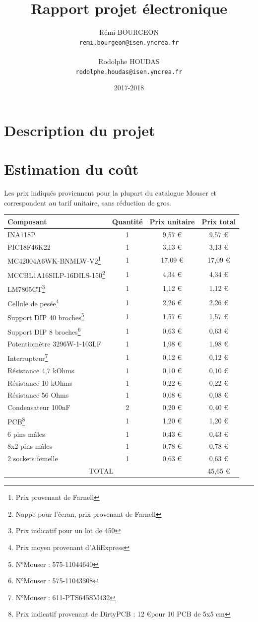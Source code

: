 \documentclass[a4paper,11pt,titlepage]{article}
\title{Rapport projet électronique}
\author{Rémi BOURGEON\\
\texttt{remi.bourgeon@isen.yncrea.fr}\\\\
Rodolphe HOUDAS\\
\texttt{rodolphe.houdas@isen.yncrea.fr}}
\date{2017-2018}
\begin{document}
\maketitle
\tableofcontents
\newpage


\section{Description du projet}

\section{Estimation du coût}

Les prix indiqués proviennent pour la plupart du catalogue Mouser et correspondent au tarif unitaire, sans réduction de gros.\\

\noindent
\begin{tabularx}{\textwidth}{l|c|c|c}
Composant&Quantité&Prix unitaire&Prix total\\
\hline
INA118P & 1 & 9,57 \euro & 9,57 \euro\\
PIC18F46K22 & 1 & 3,13 \euro & 3,13 \euro\\
MC42004A6WK-BNMLW-V2\footnote{Prix provenant de Farnell} & 1 & 17,09 \euro & 17,09 \euro\\
MCCBL1A16SILP-16DILS-150\footnote{Nappe pour l'écran, prix provenant de Farnell} & 1 & 4,34 \euro & 4,34 \euro\\
LM7805CT\footnote{Prix indicatif pour un lot de 450} & 1 & 1,12 \euro & 1,12 \euro\\
Cellule de pesée\footnote{Prix moyen provenant d'AliExpress} & 1 & 2,26 \euro & 2,26 \euro\\
Support DIP 40 broches\footnote{N°Mouser : 575-11044640} & 1 & 1,57 \euro & 1,57 \euro\\
Support DIP 8 broches\footnote{N°Mouser : 575-11043308} & 1 & 0,63 \euro & 0,63 \euro\\
Potentiomètre 3296W-1-103LF&1&1,98 \euro&1,98 \euro\\
Interrupteur\footnote{N°Mouser : 611-PTS645SM432} & 1 & 0,12 \euro & 0,12 \euro\\
Résistance 4,7 kOhms&1&0,10 \euro&0,10 \euro\\
Résistance 10 kOhms&1&0,22 \euro&0,22 \euro\\
Résistance 56 Ohms&1&0,08 \euro&0,08 \euro\\
Condensateur 100nF&2&0,20 \euro&0,40 \euro\\
PCB\footnote{Prix indicatif provenant de DirtyPCB : 12 \euro pour 10 PCB de 5x5 cm} & 1 & 1,20 \euro & 1,20 \euro\\
6 pins mâles&1&0,43 \euro&0,43 \euro\\
8x2 pins mâles&1&0,78 \euro&0,78 \euro\\
2 sockets femelle&1&0,63 \euro&0,63 \euro\\
\hline
\multicolumn{3}{c|}{TOTAL} & 45,65 \euro\\
\end{tabularx}
\end{document}
